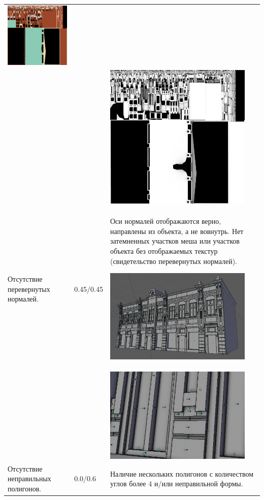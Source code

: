 \begin{longtable}{|p{4cm}|p{2.5cm}|p{7.5cm}|}
    \includegraphics[width=7cm]{src/tec_19} \\
    & & \includegraphics[width=7cm]{src/tec_20} \\
    \hline   
    Отсутствие перевернутых нормалей. & 0.45/0.45 & Оси нормалей отображаются верно, направлены из объекта, а не вовнутрь. Нет затемненных участков меша или участков объекта без отображаемых текстур (свидетельство перевернутых нормалей).

    \includegraphics[width=7cm]{src/norm_19} \\
    & & \includegraphics[width=7cm]{src/norm_20}\\
    \hline    
    Отсутствие неправильных полигонов. & 0.0/0.6 & Наличие нескольких полигонов с количеством углов более 4 и/или неправильной формы. 


\end{longtable}
